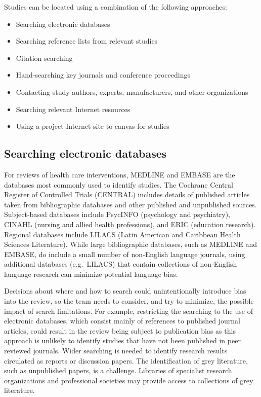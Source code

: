 \documentclass[
  11pt,
  a4paper,
  DIV=11,
  numbers=noendperiod]{scrreprt}
\begin{document}
Studies can be located using a combination of the following approaches:

\begin{itemize}
\item
  Searching electronic databases
\item
  Searching reference lists from relevant studies
\item
  Citation searching
\item
  Hand-searching key journals and conference proceedings
\item
  Contacting study authors, experts, manufacturers, and other
  organizations
\item
  Searching relevant Internet resources
\item
  Using a project Internet site to canvas for studies
\end{itemize}

\subsection{Searching electronic
databases}\label{searching-electronic-databases}

For reviews of health care interventions, MEDLINE and EMBASE are the
databases most commonly used to identify studies. The Cochrane Central
Register of Controlled Trials (CENTRAL) includes details of published
articles taken from bibliographic databases and other published and
unpublished sources. Subject-based databases include PsycINFO
(psychology and psychiatry), CINAHL (nursing and allied health
professions), and ERIC (education research). Regional databases include
LILACS (Latin American and Caribbean Health Sciences Literature). While
large bibliographic databases, such as MEDLINE and EMBASE, do include a
small number of non-English language journals, using additional
databases (e.g.~LILACS) that contain collections of non-English language
research can minimize potential language bias.

Decisions about where and how to search could unintentionally introduce
bias into the review, so the team needs to consider, and try to
minimize, the possible impact of search limitations. For example,
restricting the searching to the use of electronic databases, which
consist mainly of references to published journal articles, could result
in the review being subject to publication bias as this approach is
unlikely to identify studies that have not been published in peer
reviewed journals. Wider searching is needed to identify research
results circulated as reports or discussion papers. The identification
of grey literature, such as unpublished papers, is a challenge.
Libraries of specialist research organizations and professional
societies may provide access to collections of grey literature.
\end{document}
